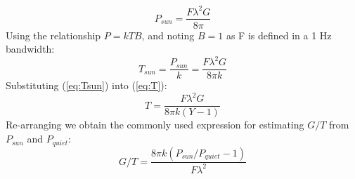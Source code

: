 \documentclass{article}
\begin{document}
\begin{equation}
P_{sun} = \frac{F\lambda^2G}{8\pi}
\end{equation}
Using the relationship $P=kTB$, and noting $B=1$ as F is defined in a 1 Hz bandwidth:
\begin{equation} \label{eq:Tsun}
T_{sun} = \frac{P_{sun}}{k} = \frac{F\lambda^2G}{8\pi k}
\end{equation}
Substituting (\ref{eq:Tsun}) into (\ref{eq:T}):
\begin{equation}
T = \frac{F\lambda^2G}{8\pi k(Y-1)}
\end{equation}
Re-arranging we obtain the commonly used expression for estimating $G/T$ from $P_{sun}$ and $P_{quiet}$:
\begin{equation}
G/T = \frac{8\pi k(P_{sun}/P_{quiet}-1)}{F\lambda^2}
\end{equation}



\end{document}
